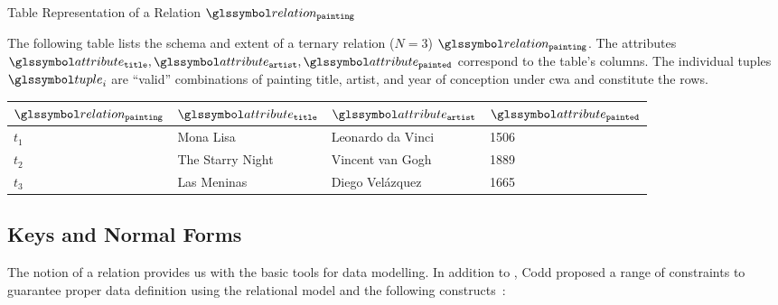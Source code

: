 \begin{example}[label=example:relational_table]{Table Representation of a Relation $\relation_{\mathtt{painting}}$}{}
    
    The following table lists the schema and extent of a ternary relation ($N = 3$) $\relation_{\mathtt{painting}}$. The attributes $\attribute_{\mathtt{title}}, \attribute_{\mathtt{artist}}, \attribute_{\mathtt{painted}}$ correspond to the table's columns. The individual tuples $\tuple_i$ are ``valid'' combinations of painting title, artist, and year of conception under \acrshort{cwa} and constitute the rows.
        
    \begin{center}
        \begin{tabular}{ l || l | l | l |}
            $\relation_{\mathtt{painting}}$ & $\attribute_\mathtt{title}$  & $\attribute_{\mathtt{artist}}$  & $\attribute_{\mathtt{painted}}$ \\ 
            \hline
            \hline
            $t_1$ & Mona Lisa &  Leonardo da Vinci & 1506 \\
            \hline
            $t_2$ & The Starry Night & Vincent van Gogh & 1889 \\
            \hline
            $t_3$ & Las Meninas & Diego Velázquez & 1665 \\
            \hline
        \end{tabular}
    \end{center}
\end{example}


\subsection{Keys and Normal Forms}

The notion of a relation provides us with the basic tools for data modelling. In addition to , Codd proposed a range of constraints to guarantee proper data definition using the relational model and the following constructs~\cite{Codd:1970Relational}:

